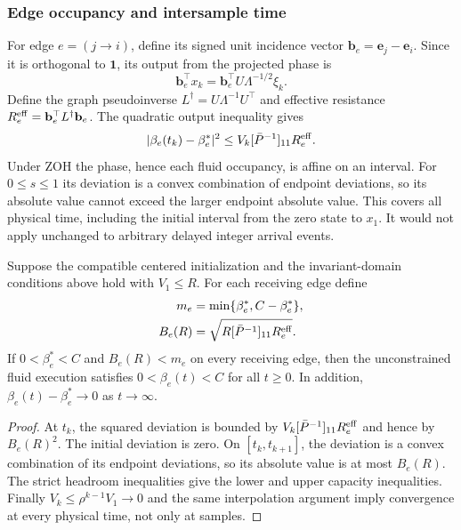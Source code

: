 \subsubsection{Edge occupancy and intersample time}
For edge $e=(j\to i)$, define its signed unit incidence vector
$\mathbf b_e=\mathbf e_j-\mathbf e_i$. Since it is orthogonal to
$\mathbf1$, its output from the projected phase is
\[
 \mathbf b_e^\top x_k=\mathbf b_e^\top U\Lambda^{-1/2}\xi_k.
\]
Define the graph pseudoinverse $L^\dagger=U\Lambda^{-1}U^\top$ and
effective resistance $R_e^{\rm eff}=\mathbf b_e^\top L^\dagger\mathbf b_e$.
The quadratic output inequality gives
\begin{equation}
 |\beta_e(t_k)-\beta_e^*|^2
 \le V_k[\bar P^{-1}]_{11}R_e^{\rm eff}.
 \label{eq:btd_edge_bound}
\end{equation}
Under ZOH the phase, hence each fluid occupancy, is affine on an interval.
For $0\le s\le1$ its deviation is a convex combination of endpoint
deviations, so its absolute value cannot exceed the larger endpoint
absolute value. This covers all physical time, including the initial
interval from the zero state to $x_1$. It would not apply unchanged to
arbitrary delayed integer arrival events.

\begin{btdcorollary}
\label{cor:btd_buffer_safety}
Suppose the compatible centered initialization and the invariant-domain
conditions above hold with $V_1\le R$. For each receiving edge define
\begin{align}
 m_e&=\min\{\beta_e^*,C-\beta_e^*\},\nonumber\\
 B_e(R)&=\sqrt{R[\bar P^{-1}]_{11}R_e^{\rm eff}}.
 \label{eq:btd_buffer_headroom_condition}
\end{align}
If $0<\beta_e^*<C$ and $B_e(R)<m_e$ on every receiving edge,
then the unconstrained fluid execution satisfies
$0<\beta_e(t)<C$ for all $t\ge0$. In addition,
$\beta_e(t)-\beta_e^*\to0$ as $t\to\infty$.
\end{btdcorollary}
\begin{proof}
At $t_k$, the squared deviation is bounded by
$V_k[\bar P^{-1}]_{11}R_e^{\rm eff}$ and hence by $B_e(R)^2$.
The initial deviation is zero. On $[t_k,t_{k+1}]$, the deviation is a
convex combination of its endpoint deviations, so its absolute value
is at most $B_e(R)$. The strict headroom inequalities give the lower
and upper capacity inequalities. Finally $V_k\le\rho^{k-1}V_1\to0$
and the same interpolation argument imply convergence at every
physical time, not only at samples.
\end{proof}

